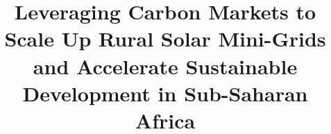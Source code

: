\documentclass[preprint,12pt]{elsarticle}
\begin{document}
\begin{frontmatter}



\title{Leveraging Carbon Markets to Scale Up Rural Solar Mini-Grids and Accelerate Sustainable Development in Sub-Saharan Africa}




\begin{abstract}
	
\end{abstract}


\end{frontmatter}
\end{document}

